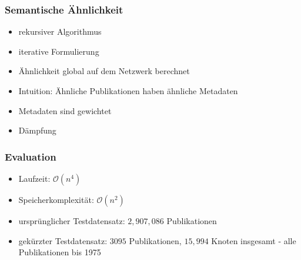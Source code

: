 \documentclass[12pt, xcolor=table]{beamer}
\begin{document}
\begin{frame}
    \frametitle{Semantische Ähnlichkeit}
    \begin{itemize}
        \item rekursiver Algorithmus
        \item iterative Formulierung
        \item Ähnlichkeit global auf dem Netzwerk berechnet
        \item Intuition: Ähnliche Publikationen haben ähnliche Metadaten
        \item Metadaten sind gewichtet
        \item Dämpfung
    \end{itemize}
\end{frame}

\begin{frame}
    \frametitle{Evaluation}
    \begin{itemize}
        \item Laufzeit: $\mathcal{O}(n^4)$
        \item Speicherkomplexität: $\mathcal{O}(n^2)$
        \item ursprünglicher Testdatensatz: $2,907,086$ Publikationen
        \item gekürzter Testdatensatz: $3095$ Publikationen, $15,994$ Knoten insgesamt - alle Publikationen bis 1975
    \end{itemize}
\end{frame}
\end{document}
